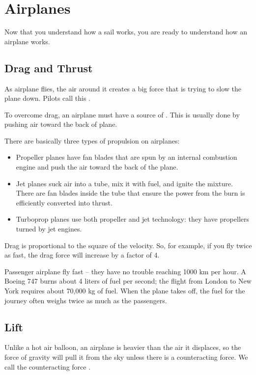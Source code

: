 \chapter{Airplanes}

Now that you understand how a sail works,  you are ready to understand how an airplane works.   

\section{Drag and Thrust}

As airplane flies,  the air around it creates a big force that is trying to slow the 
plane down.  Pilots call this .


To overcome drag,  an airplane must have a source of .  This is usually done by pushing air toward the back of plane.

There are basically three types of propulsion on airplanes:

\begin{itemize}
\item Propeller planes have fan blades that are spun by an internal combustion engine and push the air toward the back of the plane.  
\item Jet planes suck air into a tube,  mix it with fuel,  and ignite the mixture.  There are fan blades inside the tube that ensure
the power from the burn is efficiently converted into thrust.
\item Turboprop planes use both propeller and jet technology: they have propellers turned by jet engines.
\end{itemize}

Drag is proportional to the square of the velocity.  So, for example,  if you fly twice as fast,  the drag force will increase by a factor of 4. 

Passenger airplane fly fast -- they have no trouble reaching 1000 km per hour.   A Boeing 747 burns about 4 liters of fuel per second; the flight from London to New York requires about 70,000 kg of fuel.  When the plane takes off,  the fuel for the journey often weighs twice as much as the passengers.
 
\section{Lift}

Unlike a hot air balloon,   an airplane is heavier than the 
air it displaces,   so the force of gravity will pull it from the sky unless there is a counteracting force.  We call the counteracting force .

